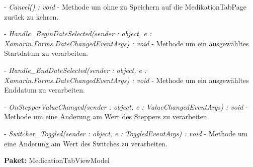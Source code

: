 \documentclass[a4paper]{scrreprt}
\begin{document}
- \textit{Cancel() : void} - Methode um ohne zu Speichern auf die MedikationTabPage zurück zu kehren.

- \textit{Handle\_BeginDateSelected(sender : object, e : Xamarin.Forms.DateChangedEventArgs) : void} - Methode um ein ausgewähltes Startdatum zu verarbeiten.

- \textit{Handle\_EndDateSelected(sender : object, e : Xamarin.Forms.DateChangedEventArgs) : void} - Methode um ein ausgewähltes Enddatum zu verarbeiten.

- \textit{OnStepperValueChanged(sender : object, e : ValueChangedEventArgs) : void} - Methode um eine Änderung am Wert des Steppers zu verarbeiten.

- \textit{Switcher\_Toggled(sender : object, e : ToggledEventArgs) : void} - Methode um eine Änderung am Wert des Switches zu verarbeiten.

\textbf{Paket:} MedicationTabViewModel
\end{document}
